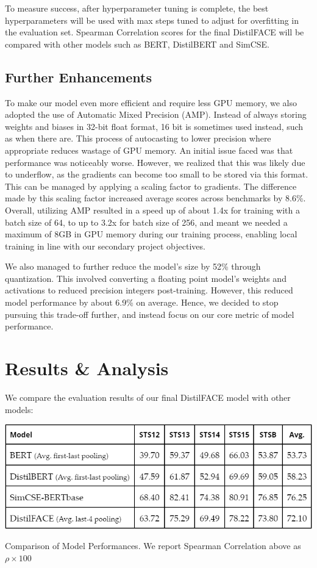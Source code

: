 \documentclass[10pt,twocolumn,letterpaper]{article}
\begin{document}
To measure success, after hyperparameter tuning is complete, the best hyperparameters will be used with max steps tuned to adjust for overfitting in the evaluation set. Spearman Correlation scores for the final DistilFACE will be compared with other models such as BERT, DistilBERT and SimCSE. 

\subsection{Further Enhancements}

To make our model even more efficient and require less GPU memory, we also adopted the use of Automatic Mixed Precision (AMP). Instead of always storing weights and biases in 32-bit float format, 16 bit is sometimes used instead, such as when there are. This process of autocasting to lower precision where appropriate reduces wastage of GPU memory. An initial issue faced was that performance was noticeably worse. However, we realized that this was likely due to underflow, as the gradients can become too small to be stored via this format. This can be managed by applying a scaling factor to gradients. The difference made by this scaling factor increased average scores across benchmarks by 8.6\%. Overall, utilizing AMP resulted in a speed up of about 1.4x for training with a batch size of 64, to up to 3.2x for batch size of 256, and meant we needed a maximum of 8GB in GPU memory during our training process, enabling local training in line with our secondary project objectives.

We also managed to further reduce the model's size by 52\% through quantization. This involved converting a floating point model’s weights and activations to reduced precision integers post-training.  However, this reduced model performance by about 6.9\% on average. Hence, we decided to stop pursuing this trade-off further, and instead focus on our core metric of model performance.


\section{Results \& Analysis}

We compare the evaluation results of our final DistilFACE model with other models:

\begin{table}[hbt!]
\centering
\includegraphics[scale=0.4]{images/Results-Compare-Models.png}
\caption{Comparison of Model Performances. We report Spearman Correlation above as \(\rho \times 100\)}
\label{fig:short}
\end{table}
\end{document}

